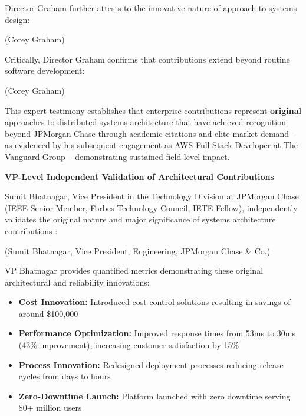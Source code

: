 Director Graham further attests to the innovative nature of \drs approach to systems design:

 (Corey Graham)

Critically, Director Graham confirms that \drs contributions extend beyond routine software development:

 (Corey Graham)

This expert testimony establishes that \drs enterprise contributions represent \textbf{original} approaches to distributed systems architecture that have achieved recognition beyond JPMorgan Chase through academic citations and elite market demand -- as evidenced by his subsequent engagement as AWS Full Stack Developer at The Vanguard Group -- demonstrating sustained field-level impact.

\textbf{VP-Level Independent Validation of Architectural Contributions}

Sumit Bhatnagar, Vice President in the Technology Division at JPMorgan Chase (IEEE Senior Member, Forbes Technology Council, IETE Fellow), independently validates the original nature and major significance of \drs systems architecture contributions \cite{CR9}:

 (Sumit Bhatnagar, Vice President, Engineering, JPMorgan Chase \& Co.)

VP Bhatnagar provides quantified metrics demonstrating these original architectural and reliability innovations:

\begin{itemize}
    \item \textbf{Cost Innovation:} Introduced cost-control solutions resulting in savings of around \$100,000
    \item \textbf{Performance Optimization:} Improved response times from 53ms to 30ms (43\% improvement), increasing customer satisfaction by 15\%
    \item \textbf{Process Innovation:} Redesigned deployment processes reducing release cycles from days to hours
    \item \textbf{Zero-Downtime Launch:} Platform launched with zero downtime serving 80+ million users
\end{itemize}

